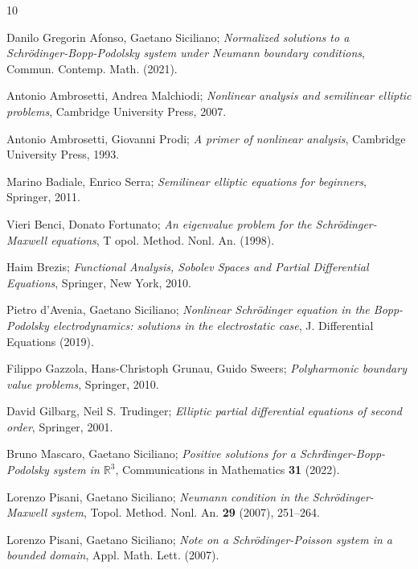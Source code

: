 \documentclass[reqno]{amsart}
\begin{document}
\begin{thebibliography}{10}

Danilo Gregorin Afonso, Gaetano Siciliano;
\emph{Normalized solutions to a {S}chr\"odinger-{B}opp-{P}odolsky system under
{N}eumann boundary conditions},
 Commun. Contemp. Math. (2021).

 Antonio Ambrosetti, Andrea Malchiodi;
\emph{Nonlinear analysis and semilinear elliptic problems}, 
Cambridge University Press, 2007.

 Antonio Ambrosetti, Giovanni Prodi;
\emph{A primer of nonlinear analysis},
 Cambridge University Press, 1993.

 Marino Badiale, Enrico Serra;
\emph{Semilinear elliptic equations for beginners}, Springer, 2011.

 Vieri Benci, Donato Fortunato;
\emph{An eigenvalue problem for the {{S}}chr\"odinger-{{M}}axwell equations}, T
 opol. Method. Nonl. An. (1998).

 Haim Brezis;
\emph{Functional Analysis, Sobolev Spaces and Partial
 Differential Equations}, Springer, New York, 2010.

 Pietro d'Avenia, Gaetano Siciliano;
\emph{Nonlinear Schr\"odinger equation
 in the {B}opp-{P}odolsky electrodynamics: solutions in the electrostatic
 case}, J. Differential Equations (2019).

 Filippo Gazzola, Hans-Christoph Grunau, Guido Sweers;
\emph{Polyharmonic boundary value problems}, Springer, 2010.

 David Gilbarg, Neil S. Trudinger;
\emph{Elliptic partial differential equations of second order}, Springer, 2001.

 Bruno Mascaro, Gaetano Siciliano;
\emph{Positive solutions for a {S}chr\"dinger-{B}opp-{P}odolsky system in $\mathbb {R}^{3}$},
Communications in Mathematics \textbf{31} (2022).

 Lorenzo Pisani, Gaetano Siciliano;
\emph{Neumann condition in the
 {S}chr\"odinger-{M}axwell system}, Topol. Method. Nonl. An. \textbf{29}
 (2007), 251--264.

 Lorenzo Pisani, Gaetano Siciliano;
\emph{Note on a {S}chr\"odinger-{P}oisson system in a bounded domain},
 Appl. Math. Lett. (2007).


\end{thebibliography}
\end{document}
